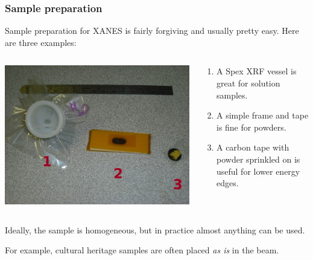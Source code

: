 \documentclass[10pt, xcolor=x11names, compress]{beamer}
\begin{document}
\begin{frame}
  \frametitle{Sample preparation}

  Sample preparation for XANES is fairly forgiving and usually pretty
  easy.  Here are three examples:

  \smallskip

  \begin{columns}
    \begin{column}{0.5\linewidth}
      \includegraphics[width=\linewidth]{images/samples.jpg}
    \end{column}
    \begin{column}{0.5\linewidth}
      \begin{enumerate}
      \item A Spex XRF vessel is great for solution samples.
      \item A simple frame and tape is fine for powders.
      \item A carbon tape with powder sprinkled on is useful for lower
        energy edges.
      \end{enumerate}

    \end{column}
  \end{columns}

  \bigskip

  Ideally, the sample is homogeneous, but in practice almost anything
  can be used.

  \smallskip

  For example, cultural heritage samples are often placed \textit{as
    is} in the beam.
\end{frame}
\end{document}
